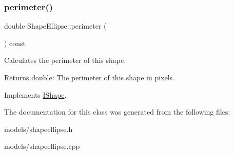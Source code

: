 \mbox{\label{class_shape_ellipse_a397c01c912105854e065f6c2d766f73a}} 
\subsubsection{\texorpdfstring{perimeter()}{perimeter()}}
{\footnotesize\ttfamily double Shape\+Ellipse\+::perimeter (\begin{DoxyParamCaption}{ }\end{DoxyParamCaption}) const\hspace{0.3cm}{\ttfamily [virtual]}}



Calculates the perimeter of this shape. 

\begin{DoxyReturn}{Returns}
double\+: The perimeter of this shape in pixels. 
\end{DoxyReturn}


Implements \mbox{\hyperlink{class_i_shape_a485f6770c4e56b31c76d368b959b6f00}{I\+Shape}}.



The documentation for this class was generated from the following files\+:\begin{DoxyCompactItemize}
\item 
models/shapeellipse.\+h\item 
models/shapeellipse.\+cpp\end{DoxyCompactItemize}
